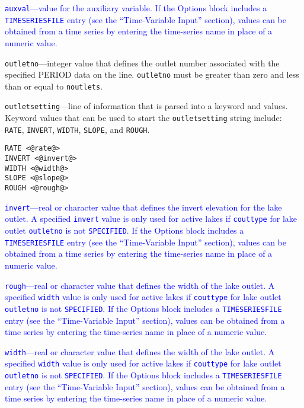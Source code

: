 \begin{description}
\item \textcolor{blue}{\texttt{auxval}---value for the auxiliary variable. If the Options block includes a \texttt{TIMESERIESFILE} entry (see the ``Time-Variable Input'' section), values can be obtained from a time series by entering the time-series name in place of a numeric value.}

\item \texttt{outletno}---integer value that defines the outlet number associated with the specified PERIOD data on the line. \texttt{outletno} must be greater than zero and less than or equal to \texttt{noutlets}.

\item \texttt{outletsetting}---line of information that is parsed into a keyword and values.  Keyword values that can be used to start the \texttt{outletsetting} string include: \texttt{RATE}, \texttt{INVERT}, \texttt{WIDTH}, \texttt{SLOPE}, and \texttt{ROUGH}.

\begin{lstlisting}[style=blockdefinition]
RATE <@rate@>
INVERT <@invert@>
WIDTH <@width@>
SLOPE <@slope@>
ROUGH <@rough@>
\end{lstlisting}

\item \textcolor{blue}{\texttt{invert}---real or character value that defines the invert elevation for the lake outlet. A specified \texttt{invert} value is only used for active lakes if \texttt{couttype} for lake outlet \texttt{outletno} is not \texttt{SPECIFIED}. If the Options block includes a \texttt{TIMESERIESFILE} entry (see the ``Time-Variable Input'' section), values can be obtained from a time series by entering the time-series name in place of a numeric value.}

\item \textcolor{blue}{\texttt{rough}---real or character value that defines the width of the lake outlet. A specified \texttt{width} value is only used for active lakes if \texttt{couttype} for lake outlet \texttt{outletno} is not \texttt{SPECIFIED}. If the Options block includes a \texttt{TIMESERIESFILE} entry (see the ``Time-Variable Input'' section), values can be obtained from a time series by entering the time-series name in place of a numeric value.}

\item \textcolor{blue}{\texttt{width}---real or character value that defines the width of the lake outlet. A specified \texttt{width} value is only used for active lakes if \texttt{couttype} for lake outlet \texttt{outletno} is not \texttt{SPECIFIED}. If the Options block includes a \texttt{TIMESERIESFILE} entry (see the ``Time-Variable Input'' section), values can be obtained from a time series by entering the time-series name in place of a numeric value.}


\end{description}
